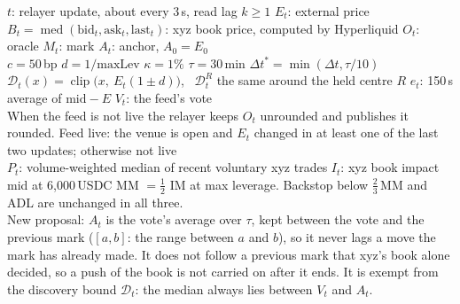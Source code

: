 \documentclass[9pt,a4paper,landscape]{extarticle}
\newcommand{\med}{\operatorname{med}}
\newcommand{\clip}{\operatorname{clip}}
\newcommand{\D}{\mathcal{D}}
\begin{document}
\vspace{1.5ex}
{\small
$t$: relayer update, about every 3\,s, read lag $k \ge 1$ \quad
$E_t$: external price \quad
$B_t = \med(\text{bid}_t, \text{ask}_t, \text{last}_t)$: xyz book price, computed by Hyperliquid \quad
$O_t$: oracle \quad $M_t$: mark \quad
$A_t$: anchor, $A_0 = E_0$\\
$c = 50$\,bp \quad $d = 1/\text{maxLev}$ \quad $\kappa = 1\%$ \quad $\tau = 30$\,min \quad $\Delta t^* = \min(\Delta t, \tau/10)$ \quad
$\D_t(x) = \clip\big(x,\ E_t(1\pm d)\big)$, \ $\D^R_t$ the same around the held centre $R$ \quad
$e_t$: 150\,s average of $\mathrm{mid} - E$ \quad $V_t$: the feed's vote\\
When the feed is not live the relayer keeps $O_t$ unrounded and publishes it rounded. Feed live: the venue is open and $E_t$ changed in at least one of the last two updates; otherwise not live\\
$P_t$: volume-weighted median of recent voluntary xyz trades \quad
$I_t$: xyz book impact mid at 6{,}000\,USDC \quad
MM $= \tfrac12$ IM at max leverage. \quad
Backstop below $\tfrac23$\,MM and ADL are unchanged in all three.\\[0.6ex]
New proposal: $A_t$ is the vote's average over $\tau$, kept between the vote and the previous mark ($[a,b]$: the range between $a$ and $b$), so it never lags a move the mark has already made. It does not follow a previous mark that xyz's book alone decided, so a push of the book is not carried on after it ends. It is exempt from the discovery bound $\D_t$: the median always lies between $V_t$ and $A_t$.}
\end{document}
